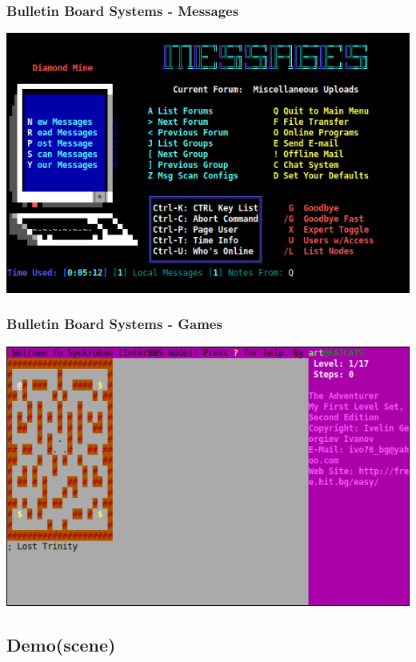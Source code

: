 \documentclass{beamer}
\begin{document}
\begin{frame}
	\frametitle{Bulletin Board Systems - Messages}

	\begin{center}
	\includegraphics[width=\textwidth]{warez_messages.png}
	\end{center}
\end{frame}

\begin{frame}
	\frametitle{Bulletin Board Systems - Games}

	\begin{center}
	\includegraphics[width=\textwidth]{warez_sokoban.png}
	\end{center}
\end{frame}

\subsection{Demo(scene)}
\end{document}
